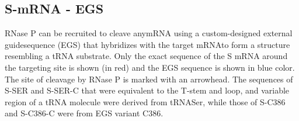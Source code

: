 \documentclass[twoside,a4paper]{report}
\begin{document}
\clearpage
	\subsection{S-mRNA - EGS }
	
	 RNase P  can  be  recruited  to cleave anymRNA  using  a  custom-designed  external  guidesequence  (EGS)  that  hybridizes  with  the  target  mRNAto form a structure resembling a tRNA substrate. Only the exact sequence of the S mRNA around the targeting site is shown (in red) and the EGS sequence is shown in blue color. The site of cleavage by RNase P is marked with an arrowhead. The sequences of S-SER and S-SER-C that were equivalent to the T-stem and loop, and variable region of a tRNA molecule were derived from tRNASer, while those of S-C386 and S-C386-C were from EGS variant C386.\\
\end{document}

